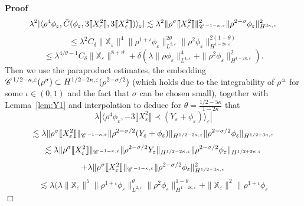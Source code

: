 \documentclass[a4paper,11pt]{article}
\newenvironment{proof}{\noindent\textbf{Proof\ }}{\hspace*{\fill}$\Box$\medskip}
\numberwithin{equation}{section}
\newcommand{\CC}{\mathscr{C} \hspace{.1em}}
\begin{document}
\begin{proof}
  \[ \lambda^2 | \langle \rho^4 \phi_{\varepsilon}, \tilde{C}
     (\phi_{\varepsilon}, 3 \llbracket X_{\varepsilon}^2 \rrbracket, 3
     \llbracket X_{\varepsilon}^2 \rrbracket) \rangle_{\varepsilon} | \lesssim
     \lambda^2 \| \rho^{\sigma} \llbracket X_{\varepsilon}^2 \rrbracket
     \|_{\CC^{- 1 - \kappa, \varepsilon}}^2  \| \rho^{2 - \sigma}
     \phi_{\varepsilon} \|^2_{H^{3 \kappa, \varepsilon}} \]
  \[ \leqslant \lambda^2 C_{\delta} \|\mathbb{X}_{\varepsilon} \|^4  \|
     \rho^{1 + \iota} \phi_{\varepsilon} \|^{2 \theta}_{L^{2, \varepsilon}} 
     \| \rho^2 \phi_{\varepsilon} \|^{2 (1 - \theta)}_{H^{1 - 2 \kappa,
     \varepsilon}} \]
  \[ \leqslant \lambda^{4 / \theta - 1} C_{\delta} \|\mathbb{X}_{\varepsilon}
     \|^{8 + \vartheta} + \delta (\lambda \| \rho \phi_{\varepsilon} \|_{L^{4,
     \varepsilon}}^4 +\| \rho^2 \phi_{\varepsilon} \|_{H^{1 - 2 \kappa,
     \varepsilon}}^2) . \]
  Then we use the paraproduct estimates, the embedding $\CC^{1 / 2 - \kappa,
  \varepsilon} (\rho^{\sigma}) \subset H^{1 / 2 - 2 \kappa, \varepsilon}
  (\rho^{2 - \sigma / 2})$ (which holds due to the integrability of $\rho^{4
  \iota}$ for some $\iota \in (0, 1)$ and the fact that $\sigma$ can be chosen
  small), together with Lemma~\ref{lem:Y1} and interpolation to deduce for
  $\theta = \frac{1 / 2 - 5 \kappa}{1 - 2 \kappa}$ that
  \[ \lambda | \langle \rho^4 \phi_{\varepsilon}, - 3 \llbracket
     X_{\varepsilon}^2 \rrbracket \prec (Y_{\varepsilon} + \phi_{\varepsilon})
     \rangle_{\varepsilon} | \]
  \[ \lesssim \lambda \| \rho^{\sigma} \llbracket X_{\varepsilon}^2 \rrbracket
     \|_{\CC^{- 1 - \kappa, \varepsilon}} \| \rho^{2 - \sigma / 2}
     (Y_{\varepsilon} + \phi_{\varepsilon})\|_{H^{1 / 2 - 2 \kappa,
     \varepsilon}}  \| \rho^{2 - \sigma / 2} \phi_{\varepsilon} \|_{H^{1 / 2 +
     3 \kappa, \varepsilon}} \]
  \[ \lesssim \lambda \| \rho^{\sigma} \llbracket X_{\varepsilon}^2 \rrbracket
     \|_{\CC^{- 1 - \kappa, \varepsilon}} \| \rho^{2 - \sigma / 2}
     Y_{\varepsilon} \|_{H^{1 / 2 - 2 \kappa, \varepsilon}}  \| \rho^{2 -
     \sigma / 2} \phi_{\varepsilon} \|_{H^{1 / 2 + 3 \kappa, \varepsilon}} \]
  \[ + \lambda \| \rho^{\sigma} \llbracket X_{\varepsilon}^2 \rrbracket
     \|_{\CC^{- 1 - \kappa, \varepsilon}}  \| \rho^{2 - \sigma / 2}
     \phi_{\varepsilon} \|_{H^{1 / 2 + 3 \kappa, \varepsilon}}^2 \]
  \[ \lesssim \lambda  (\lambda \|\mathbb{X}_{\varepsilon} \|^5 \|
     \rho^{1 + \iota} \phi_{\varepsilon} \|_{L^{2, \varepsilon}}^{\theta} \|
     \rho^2 \phi_{\varepsilon} \|_{H^{1 - 2 \kappa, \varepsilon}}^{1 - \theta}
     +\|\mathbb{X}_{\varepsilon} \|^2 \| \rho^{1 + \iota} \phi_{\varepsilon}
\]
\end{proof}
\end{document}
